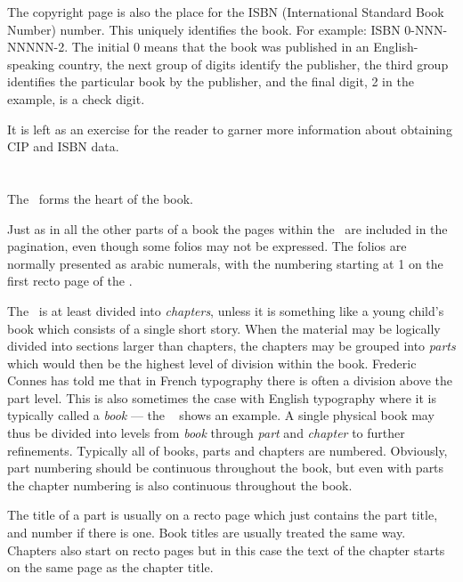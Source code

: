 \documentclass[10pt,letterpaper,extrafontsizes]{memoir}
\begin{document}
    The copyright page is also the place for the ISBN 
(International
Standard Book Number) number. This uniquely identifies the book. For example:
ISBN 0-NNN-NNNNN-2. The initial 0 means that the book was published in an
English-speaking country, the next group of digits identify the publisher,
the third group identifies the particular book by the publisher, and the final
digit, 2 in the example, is a check digit.

    It is left as an exercise for the reader to garner more information about
obtaining CIP and ISBN data.

\section{\prMainmatter}

    The \pixmainmatter\ forms the heart of the book.

    Just as in all the other parts of a book the pages within the 
\pixmainmatter\
are included in the pagination, even though some folios may
not be expressed. The folios\index{folio} are normally presented as arabic 
numerals, with 
the numbering starting at 1 on the first recto page of the \pixmainmatter.

    The \pixmainmatter\ is at least divided into \emph{chapters}, 
unless it is something like a 
young child's book which consists of a single short story.
When the material may be logically divided into sections larger than
chapters, the chapters may be grouped into \emph{parts}\index{part} which
would then be the highest level of division within the book.
Frederic Connes
has told me that in French typography there is often a division above the
part level. This is also sometimes the case with English typography where
it is typically called a \emph{book}\index{book} --- the
~\autocite[p. 21]{CMS} shows an example.
A single physical book may thus be divided into levels from \emph{book} 
through 
\emph{part} and \emph{chapter} to further refinements.  
Typically all of books, parts 
and chapters\index{chapter!number} are numbered.
Obviously, part numbering should be continuous throughout the book, but even
with parts the chapter numbering is also continuous throughout the book.

    The title of a part is usually on a recto page which 
just contains the part title, and number if there is one. 
Book titles are usually treated the same way.
Chapters also start on recto pages but in this case the text 
of the chapter\index{chapter} starts on the same page as the chapter
title.
\end{document}
